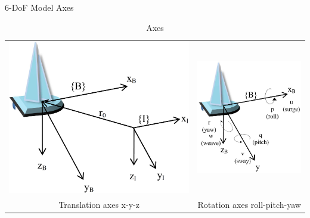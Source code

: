 \documentclass[10pt,xcolor={table,dvipsnames},t]{beamer}
\begin{document}
\begin{frame}{6-DoF Model Axes}
\begin{table}[h]
    \centering
    \begin{tabular}{cc}
         \includegraphics[width = 0.35\linewidth]{documents/figures/alves_frames.png} & \includegraphics[width = 0.35\linewidth]{documents/figures/alves_rpy.png} \\
         Translation axes x-y-z           & Rotation axes roll-pitch-yaw \\
    \end{tabular}
    \caption{Axes}
    \label{tab:fig_axes}
\end{table}
    
\end{frame}
\end{document}
